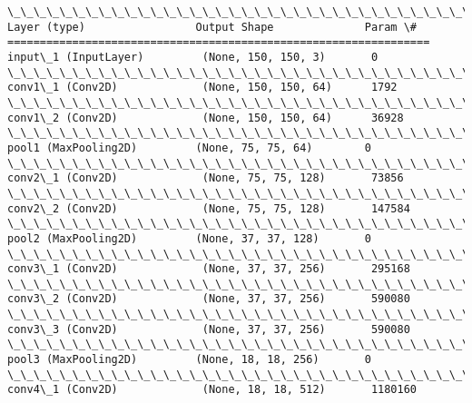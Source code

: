 \documentclass[11pt]{article}
\begin{document}
    \begin{Verbatim}[commandchars=\\\{\}]
\_\_\_\_\_\_\_\_\_\_\_\_\_\_\_\_\_\_\_\_\_\_\_\_\_\_\_\_\_\_\_\_\_\_\_\_\_\_\_\_\_\_\_\_\_\_\_\_\_\_\_\_\_\_\_\_\_\_\_\_\_\_\_\_\_
Layer (type)                 Output Shape              Param \#   
=================================================================
input\_1 (InputLayer)         (None, 150, 150, 3)       0         
\_\_\_\_\_\_\_\_\_\_\_\_\_\_\_\_\_\_\_\_\_\_\_\_\_\_\_\_\_\_\_\_\_\_\_\_\_\_\_\_\_\_\_\_\_\_\_\_\_\_\_\_\_\_\_\_\_\_\_\_\_\_\_\_\_
conv1\_1 (Conv2D)             (None, 150, 150, 64)      1792      
\_\_\_\_\_\_\_\_\_\_\_\_\_\_\_\_\_\_\_\_\_\_\_\_\_\_\_\_\_\_\_\_\_\_\_\_\_\_\_\_\_\_\_\_\_\_\_\_\_\_\_\_\_\_\_\_\_\_\_\_\_\_\_\_\_
conv1\_2 (Conv2D)             (None, 150, 150, 64)      36928     
\_\_\_\_\_\_\_\_\_\_\_\_\_\_\_\_\_\_\_\_\_\_\_\_\_\_\_\_\_\_\_\_\_\_\_\_\_\_\_\_\_\_\_\_\_\_\_\_\_\_\_\_\_\_\_\_\_\_\_\_\_\_\_\_\_
pool1 (MaxPooling2D)         (None, 75, 75, 64)        0         
\_\_\_\_\_\_\_\_\_\_\_\_\_\_\_\_\_\_\_\_\_\_\_\_\_\_\_\_\_\_\_\_\_\_\_\_\_\_\_\_\_\_\_\_\_\_\_\_\_\_\_\_\_\_\_\_\_\_\_\_\_\_\_\_\_
conv2\_1 (Conv2D)             (None, 75, 75, 128)       73856     
\_\_\_\_\_\_\_\_\_\_\_\_\_\_\_\_\_\_\_\_\_\_\_\_\_\_\_\_\_\_\_\_\_\_\_\_\_\_\_\_\_\_\_\_\_\_\_\_\_\_\_\_\_\_\_\_\_\_\_\_\_\_\_\_\_
conv2\_2 (Conv2D)             (None, 75, 75, 128)       147584    
\_\_\_\_\_\_\_\_\_\_\_\_\_\_\_\_\_\_\_\_\_\_\_\_\_\_\_\_\_\_\_\_\_\_\_\_\_\_\_\_\_\_\_\_\_\_\_\_\_\_\_\_\_\_\_\_\_\_\_\_\_\_\_\_\_
pool2 (MaxPooling2D)         (None, 37, 37, 128)       0         
\_\_\_\_\_\_\_\_\_\_\_\_\_\_\_\_\_\_\_\_\_\_\_\_\_\_\_\_\_\_\_\_\_\_\_\_\_\_\_\_\_\_\_\_\_\_\_\_\_\_\_\_\_\_\_\_\_\_\_\_\_\_\_\_\_
conv3\_1 (Conv2D)             (None, 37, 37, 256)       295168    
\_\_\_\_\_\_\_\_\_\_\_\_\_\_\_\_\_\_\_\_\_\_\_\_\_\_\_\_\_\_\_\_\_\_\_\_\_\_\_\_\_\_\_\_\_\_\_\_\_\_\_\_\_\_\_\_\_\_\_\_\_\_\_\_\_
conv3\_2 (Conv2D)             (None, 37, 37, 256)       590080    
\_\_\_\_\_\_\_\_\_\_\_\_\_\_\_\_\_\_\_\_\_\_\_\_\_\_\_\_\_\_\_\_\_\_\_\_\_\_\_\_\_\_\_\_\_\_\_\_\_\_\_\_\_\_\_\_\_\_\_\_\_\_\_\_\_
conv3\_3 (Conv2D)             (None, 37, 37, 256)       590080    
\_\_\_\_\_\_\_\_\_\_\_\_\_\_\_\_\_\_\_\_\_\_\_\_\_\_\_\_\_\_\_\_\_\_\_\_\_\_\_\_\_\_\_\_\_\_\_\_\_\_\_\_\_\_\_\_\_\_\_\_\_\_\_\_\_
pool3 (MaxPooling2D)         (None, 18, 18, 256)       0         
\_\_\_\_\_\_\_\_\_\_\_\_\_\_\_\_\_\_\_\_\_\_\_\_\_\_\_\_\_\_\_\_\_\_\_\_\_\_\_\_\_\_\_\_\_\_\_\_\_\_\_\_\_\_\_\_\_\_\_\_\_\_\_\_\_
conv4\_1 (Conv2D)             (None, 18, 18, 512)       1180160   

\end{Verbatim}
\end{document}
